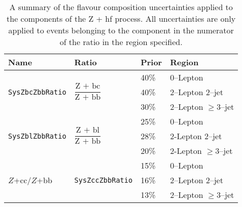 \begin{table}[!htbp]
  \begin{tabular}{llll}
    \toprule
    {\bfseries Name} & {\bfseries Ratio} & {\bfseries Prior} & {\bfseries Region}\\ 
    \midrule
    \multirow{ 3}{*}{\texttt{SysZbcZbbRatio}} & \multirow{ 3}{*}{$\dfrac{\text{Z + bc}}{\text{Z + bb}}$} & 40\% & 0--Lepton \\
                     &								    & 40\% & 2--Lepton 2--jet \\
                     &								    & 30\% & 2--Lepton $\geq$3--jet \\
    \multirow{ 3}{*}{\texttt{SysZblZbbRatio}} & \multirow{ 3}{*}{$\dfrac{\text{Z + bl}}{\text{Z + bb}}$} & 25\% & 0--Lepton \\
                     &								    & 28\% & 2-Lepton 2--jet \\
                     &								    & 20\% & 2-Lepton $\geq$3--jet \\
    \multirow{ 3}{*}{$Z$+cc/$Z$+bb} & \multirow{ 3}{*}{\texttt{SysZccZbbRatio}}    & 15\% & 0--Lepton \\
                     &								    &  16\% & 2--Lepton 2--jet \\
                     &								    &   13\% & 2--Lepton $\geq$3--jet \\
    \bottomrule
  \end{tabular}
  \caption{A summary of the flavour composition uncertainties applied to the
    components of the Z + hf process. All uncertainties are only applied to
    events belonging to the component in the numerator of the ratio in the
    region specified.}
  \label{tab:zjets-flavour-comp}
\end{table}
